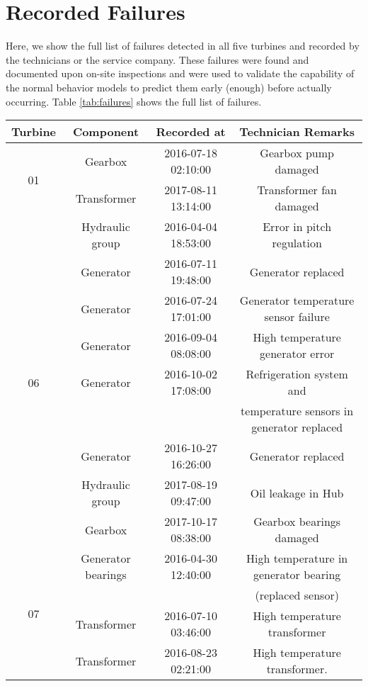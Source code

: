 \chapter{Recorded Failures}
\label{chap:appendix2}
Here, we show the full list of failures detected in all five turbines and recorded by the technicians or the service company.
These failures were found and documented upon on-site inspections and were used to validate the capability of the normal behavior models to 
predict them early (enough) before actually occurring. Table \ref{tab:failures} shows the full list of failures.

\begin{table}[H]
    \centering
    \begin{tabular}{|c|c|c|c|}
    \hline
    \textbf{Turbine} & \textbf{Component} & \textbf{Recorded at} & \textbf{Technician Remarks} \\
    \hline
    \multirow{2}{*}{01} & Gearbox & 2016-07-18 02:10:00 & Gearbox pump damaged \\
    & Transformer & 2017-08-11 13:14:00 & Transformer fan damaged \\
    \hline
    \multirow{9}{*}{06} & Hydraulic group & 2016-04-04 18:53:00 & Error in pitch regulation \\
    & Generator & 2016-07-11 19:48:00 & Generator replaced \\
    & Generator & 2016-07-24 17:01:00 & Generator temperature sensor failure \\
    & Generator & 2016-09-04 08:08:00 & High temperature generator error \\
    & Generator & 2016-10-02 17:08:00 & Refrigeration system and \\
    & & & temperature sensors in generator replaced \\
    & Generator & 2016-10-27 16:26:00 & Generator replaced \\
    & Hydraulic group & 2017-08-19 09:47:00 & Oil leakage in Hub \\
    & Gearbox & 2017-10-17 08:38:00 & Gearbox bearings damaged \\
    \hline
    \multirow{9}{*}{07} & Generator bearings & 2016-04-30 12:40:00 & High temperature in generator bearing \\
    & & & (replaced sensor) \\
    & Transformer & 2016-07-10 03:46:00 & High temperature transformer \\
    & Transformer & 2016-08-23 02:21:00 & High temperature transformer. \\

\end{tabular}
\end{table}
